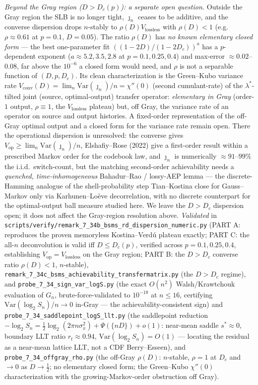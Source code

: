 \documentclass[
]{article}
\begin{document}
\emph{Beyond the Gray region ($D>D_c(p)$): a separate open question.} Outside the Gray region the
SLB is no longer tight, $\jmath_n$ ceases to be additive, and the converse dispersion drops
$n$-stably to $\rho(D)V_{\mathrm{lossless}}$ with $\rho(D)<1$ (e.g.\ $\rho\approx0.61$ at $p=0.1$,
$D=0.05$). The ratio $\rho(D)$ has \emph{no known elementary closed form} --- the best one-parameter fit
$((1-2D)/(1-2D_c))^a$ has a $p$-dependent exponent ($a\approx5.2,3.5,2.8$ at $p=0.1,0.25,0.4$) and
max-error $\approx0.02$--$0.08$, far above the $10^{-6}$ a closed form would need, and $\rho$ is not a
separable function of $(D,p,D_c)$. Its clean characterization is the Green--Kubo variance rate
$V_{\mathrm{conv}}(D)=\lim_n\mathrm{Var}(\jmath_n)/n=\chi''(0)$ (second cumulant-rate) of the
$\lambda^*$-tilted joint (source, optimal-output) transfer operator: \emph{elementary in Gray}
(order-$1$ output, $\rho\equiv1$, the $V_{\mathrm{lossless}}$ plateau) but, off Gray, the variance rate
of an operator on source and output histories. A fixed-order representation of
the off-Gray optimal output and a closed form for the variance rate remain open. There the
operational dispersion is unresolved: the converse gives
$V_{\mathrm{op}}\ge\lim_n\mathrm{Var}(\jmath_n)/n$, Elshafiy--Rose (2022) give a first-order result within a prescribed
Markov order for the codebook law, and $\jmath_n$ is numerically $\approx91$--$99\%$ the i.i.d.\
switch-count, but the matching second-order achievability needs a \emph{quenched, time-inhomogeneous}
Bahadur--Rao / lossy-AEP lemma --- the discrete-Hamming analogue of the shell-probability step
Tian--Kostina close for Gauss--Markov only via Karhunen--Lo\`eve decorrelation, with no discrete
counterpart for the optimal-output ball measure studied here. We leave the $D>D_c$ dispersion open; it does not affect the Gray-region
resolution above. \emph{Validated} in
\texttt{scripts/verify/remark\_7\_34b\_bsms\_rd\_dispersion\_numeric.py} (PART A: reproduces the
proven memoryless Kostina--Verd\'u plateau exactly; PART C: the all-$n$ deconvolution is valid iff
$D\le D_c(p)$, verified across $p=0.1,0.25,0.4$, establishing $V_{\mathrm{op}}=V_{\mathrm{lossless}}$ on
the Gray region; PART B: the $D>D_c$ converse ratio $\rho(D)<1$, $n$-stable),
\texttt{remark\_7\_34c\_bsms\_achievability\_transfermatrix.py} (the $D>D_c$ regime), and
\texttt{probe\_7\_34\_sign\_var\_logS.py} (the exact $O(n^2)$ Walsh/Krawtchouk evaluation of $G_n$,
brute-force-validated to $10^{-18}$ at $n\le16$, certifying $\mathrm{Var}(\log_2 S_n)/n\to0$ in-Gray ---
the achievability-consistent sign) and \texttt{probe\_7\_34\_saddlepoint\_logS\_llt.py} (the saddlepoint
reduction $-\log_2 S_n=\tfrac12\log_2(2\pi n\sigma_x^2)+\Psi(\{nD\})+o(1)$: near-mean saddle $s^*\approx0$,
boundary LLT ratio $r_t\approx0.94$, $\mathrm{Var}(\log_2 S_n)=O(1)$ --- locating the residual as a
near-mean lattice LLT, not a CDF Berry--Esseen), and \texttt{probe\_7\_34\_offgray\_rho.py} (the off-Gray
$\rho(D)$: $n$-stable, $\rho=1$ at $D_c$ and $\to0$ as $D\to\tfrac12$; no elementary closed form; the
Green--Kubo $\chi''(0)$ characterization with the growing-Markov-order obstruction off Gray).
\end{document}
